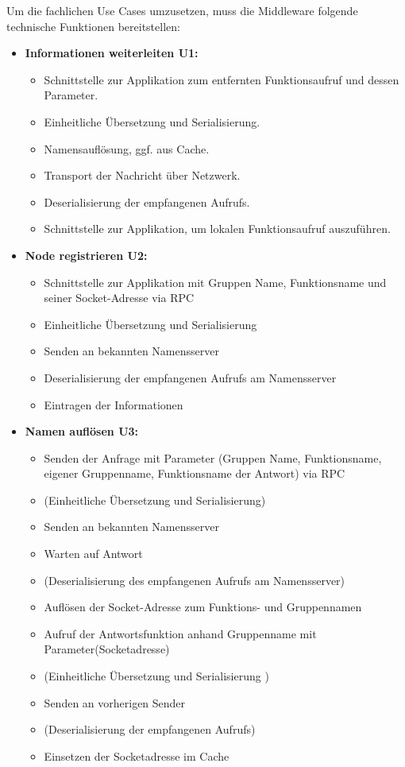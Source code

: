 Um die fachlichen Use Cases umzusetzen, muss die Middleware folgende technische Funktionen bereitstellen:

\begin{itemize}
	\item \textbf{Informationen weiterleiten U1:}\\
	\begin{itemize}
		\item Schnittstelle zur Applikation zum entfernten Funktionsaufruf und dessen Parameter.
		\item Einheitliche Übersetzung und Serialisierung. 
		\item Namensauflösung, ggf. aus Cache.
		\item Transport der Nachricht über Netzwerk. 
		\item Deserialisierung der empfangenen Aufrufs.
		\item Schnittstelle zur Applikation, um lokalen Funktionsaufruf auszuführen.  
	\end{itemize}
	
	\item \textbf{Node registrieren U2:}\\
	\begin{itemize}
		\item Schnittstelle zur Applikation mit Gruppen Name, Funktionsname und seiner Socket-Adresse via RPC
		\item Einheitliche Übersetzung und Serialisierung 
		\item Senden an bekannten Namensserver
		\item Deserialisierung der empfangenen Aufrufs am Namensserver
		\item Eintragen der Informationen
	\end{itemize}
	
	\item \textbf{Namen auflösen U3:}\\
	\begin{itemize}
		\item Senden der Anfrage mit Parameter (Gruppen Name, Funktionsname, eigener Gruppenname, Funktionsname der Antwort) via RPC
		\item (Einheitliche Übersetzung und Serialisierung)
		\item Senden an bekannten Namensserver
		\item Warten auf Antwort
		\item (Deserialisierung des empfangenen Aufrufs am Namensserver)
		\item Auflösen der Socket-Adresse zum Funktions- und Gruppennamen
		\item Aufruf der Antwortsfunktion anhand Gruppenname mit Parameter(Socketadresse)
		\item (Einheitliche Übersetzung und Serialisierung )
		\item Senden an vorherigen Sender
		\item (Deserialisierung der empfangenen Aufrufs)
		\item Einsetzen der Socketadresse im Cache
	\end{itemize}
		

\end{itemize}
